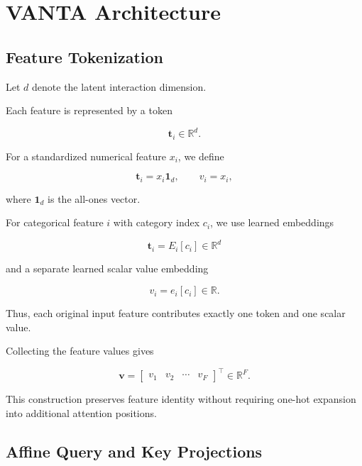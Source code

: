 \documentclass[11pt,a4paper]{article}
\newcommand{\R}{\mathbb{R}}
\begin{document}
\section{VANTA Architecture}

\subsection{Feature Tokenization}

Let $d$ denote the latent interaction dimension.

Each feature is represented by a token

\begin{equation}
\mathbf{t}_i\in\R^d.
\end{equation}

For a standardized numerical feature $x_i$,
we define

\begin{equation}
\mathbf{t}_i=x_i\mathbf{1}_d,
\qquad
v_i=x_i,
\end{equation}

where $\mathbf{1}_d$ is the all-ones vector.

For categorical feature $i$ with category
index $c_i$, we use learned embeddings

\begin{equation}
\mathbf{t}_i=E_i[c_i]\in\R^d
\end{equation}

and a separate learned scalar value embedding

\begin{equation}
v_i=e_i[c_i]\in\R.
\end{equation}

Thus, each original input feature contributes
exactly one token and one scalar value.

Collecting the feature values gives

\begin{equation}
\mathbf{v}
=
\begin{bmatrix}
v_1 & v_2 & \cdots & v_F
\end{bmatrix}^{\top}
\in\R^F.
\end{equation}

This construction preserves feature identity
without requiring one-hot expansion into
additional attention positions.

\subsection{Affine Query and Key Projections}
\end{document}
